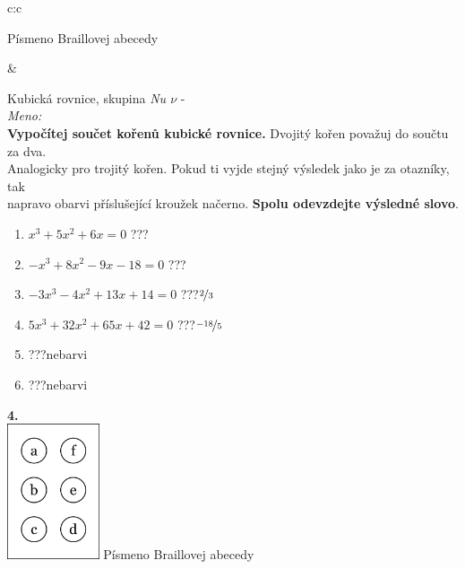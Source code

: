 \documentclass[10pt]{report}
\begin{document}
\begin{tabular}{c:c}
\begin{minipage}[c][99mm][t]{0.49\linewidth}
\begin{center}
\begin{minipage}{0.20\linewidth}
\begin{center}
{\small Písmeno Braillovej abecedy}
\end{center}
\end{minipage}
\end{center}
\end{minipage}
&
\begin{minipage}[c][99mm][t]{0.49\linewidth}
\begin{center}
\vspace{7mm}
{\huge Kubická rovnice, skupina \textit{Nu $\nu$} -}\\[4.5mm]
\textit{Meno:}\phantom{xxxxxxxxxxxxxxxxxxxxxxxxxxxxxxxxxxxxxxxxxxxxxxxxxxxxxxxxxxxxxxxxx}\\[3.5mm]
\textbf{Vypočítej součet kořenů kubické rovnice.} Dvojitý kořen považuj do součtu za dva.\\Analogicky pro trojitý kořen. Pokud ti vyjde stejný výsledek jako je za otazníky, tak\\napravo obarvi příslušející kroužek načerno. \textbf{Spolu odevzdejte výsledné slovo}.\\[3mm]
\begin{minipage}{0.77\linewidth}
\begin{center}
\begin{varwidth}{\textwidth}
\begin{enumerate}
\large
\item $x^3+5x^2+6x=0$\quad \dotfill\; ???\;\dotfill {}
\item $-x^3+8x^2-9x-18=0$\quad \dotfill\; ???\;\dotfill {}
\item $-3x^3-4x^2+13x+14=0$\quad \dotfill\; ???\;\dotfill \quad $\nicefrac{2}{3}$
\item $5x^3+32x^2+65x+42=0$\quad \dotfill\; ???\;\dotfill \quad $\nicefrac{-18}{5}$
\item \quad \dotfill\; ???\;\dotfill \quad nebarvi
\item \quad \dotfill\; ???\;\dotfill \quad nebarvi
\end{enumerate}
\end{varwidth}
\end{center}
\end{minipage}
\begin{minipage}{0.20\linewidth}
\begin{center}
{\Huge\bfseries 4.} \\[2mm]
\includegraphics[height=40mm]{../images/braille.png}
{\small Písmeno Braillovej abecedy}
\end{center}
\end{minipage}
\end{center}
\end{minipage}

\end{tabular}
\end{document}
